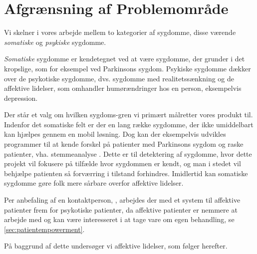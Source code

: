 \section{Afgrænsning af Problemområde}
Vi skelner i vores arbejde mellem to kategorier af sygdomme, disse værende \textit{somatiske} og \textit{psykiske} sygdomme.

\textit{Somatiske} sygdomme er kendetegnet ved at være sygdomme, der grunder i det kropslige, som for eksempel ved Parkinsons sygdom. 
Psykiske sygdomme dækker over de psykotiske sygdomme, dvs. sygdomme med realitetssænkning og de affektive lidelser, som omhandler humørændringer hos en person, eksempelvis depression. \citep{misc:netpsykpsykose}

Der står et valg om hvilken sygdoms-gren vi primært målretter vores produkt til.
Indenfor det somatiske felt er der en lang række sygdomme, der ikke umiddelbart kan hjælpes gennem en mobil løsning.
Dog kan der eksempelvis udvikles programmer til at kende forskel på patienter med Parkinsons sygdom og raske patienter, vha. stemmeanalyse \citep{6168572}.
Dette er til detektering af sygdomme, hvor dette projekt vil fokusere på tilfælde hvor sygdommen er kendt, og man i stedet vil behjælpe patienten så forværring i tilstand forhindres.
Imidlertid kan somatiske sygdomme gøre folk mere sårbare overfor affektive lidelser.

Per anbefaling af en kontaktperson, \citet{misc:janne-rasmussen}, arbejdes der med et system til affektive patienter frem for psykotiske patienter, da affektive patienter er nemmere at arbejde med og kan være interesseret i at tage vare om egen behandling, se \cref{sec:patientempowerment}.

På baggrund af dette undersøger vi affektive lidelser, som følger herefter.
